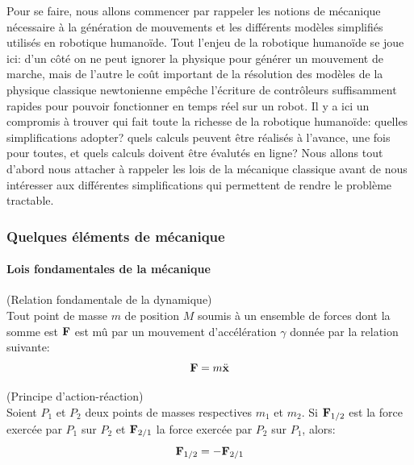 Pour se faire, nous allons commencer par rappeler les notions de
mécanique nécessaire à la génération de mouvements et les différents
modèles simplifiés utilisés en robotique humanoïde. Tout l'enjeu de la
robotique humanoïde se joue ici: d'un côté on ne peut ignorer la
physique pour générer un mouvement de marche, mais de l'autre le coût
important de la résolution des modèles de la physique classique
newtonienne empêche l'écriture de contrôleurs suffisamment rapides
pour pouvoir fonctionner en temps réel sur un robot. Il y a ici un
compromis à trouver qui fait toute la richesse de la robotique
humanoïde: quelles simplifications adopter? quels calculs peuvent être
réalisés à l'avance, une fois pour toutes, et quels calculs doivent
être évalutés en ligne? Nous allons tout d'abord nous attacher à rappeler
les lois de la mécanique classique avant de nous intéresser aux
différentes simplifications qui permettent de rendre le problème
tractable.


\subsubsection{Quelques éléments de mécanique}
\paragraph{Lois fondamentales de la mécanique}

\begin{mydef}(Relation fondamentale de la dynamique)\\
  Tout point de masse $m$ de position $M$ soumis à un ensemble de
  forces dont la somme est $\textbf{F}$ est mû par un mouvement
  d'accélération $\gamma$ donnée par la relation suivante:
  \begin{equation}\label{eq:newton}
    \textbf{F} = m \ddot{\textbf{x}}
  \end{equation}
\end{mydef}

\begin{mydef}(Principe d'action-réaction)\\
  Soient $P_1$ et $P_2$ deux points de masses respectives $m_1$ et
  $m_2$. Si $\textbf{F}_{1/2}$ est la force exercée par $P_1$ sur $P_2$ et
  $\textbf{F}_{2/1}$ la force exercée par $P_2$ sur $P_1$, alors:
  \begin{equation}\label{eq:reaction}
    \textbf{F}_{1/2} = -\textbf{F}_{2/1}
  \end{equation}
\end{mydef}

